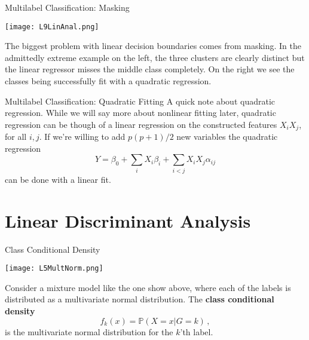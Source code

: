\documentclass[10pt, table, dvipsnames,xcdraw, handout]{beamer}
\newcommand{\bP}{\ensuremath{\mathbb{P}}}
\begin{document}
\begin{frame}[fragile]{Multilabel Classification: Masking}
  \begin{minipage}[t][0.5\textheight][t]{\textwidth}
	\centering \texttt{[image: L9LinAnal.png]} 
  \end{minipage}
  \vfill
\begin{minipage}[t][0.5\textheight][t]{\textwidth}
The biggest problem with linear decision boundaries comes from masking. In the admittedly extreme example on the left, the three clusters are clearly distinct but the linear regressor misses the middle class completely. \pause On the right we see the classes being successfully fit with a quadratic regression. 
\end{minipage}
\end{frame}


\begin{frame}[fragile]{Multilabel Classification: Quadratic Fitting}
A quick note about quadratic regression. While we will say more about nonlinear fitting later, quadratic regression can be though of a linear regression on the constructed features $X_iX_j$, for all $i,j$. If we're willing to add $p(p+1)/2$ new variables the quadratic regression
$$
Y = \beta_0 + \sum_{i}X_i\beta_i + \sum_{i<j}X_iX_j\alpha_{ij}
$$
can be done with a linear fit. 
\end{frame}


\section{Linear Discriminant Analysis}



\begin{frame}[fragile]{Class Conditional Density}
  \begin{minipage}[t][0.5\textheight][t]{\textwidth}
	\centering \texttt{[image: L5MultNorm.png]} 
  \end{minipage}
  \vfill
\begin{minipage}[t][0.5\textheight][t]{\textwidth}
Consider a mixture model like the one show above, where each of the labels is distributed as a multivariate normal distribution. The \textbf{class conditional density} 
$$
f_k(x) = \bP(X=x|G=k)\,,
$$
is the multivariate normal distribution for the $k$'th label.
\end{minipage}
\end{frame}
\end{document}
